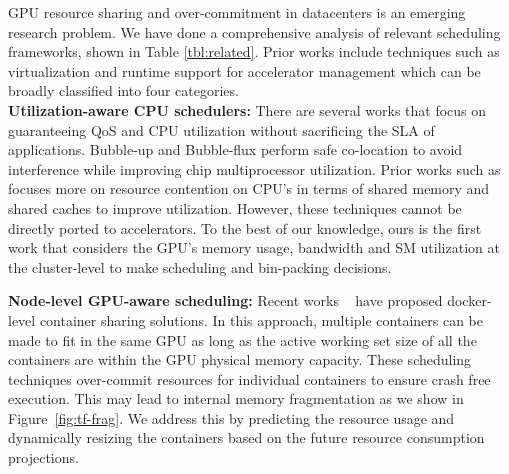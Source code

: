 

GPU resource sharing and over-commitment in datacenters is an emerging research problem. We have done a comprehensive analysis of relevant scheduling frameworks, shown in Table \ref{tbl:related}. Prior works include techniques such as virtualization and runtime support for accelerator management which can be broadly classified into four categories.\\ 

\noindent\textbf{Utilization-aware CPU schedulers:}
There are several works that focus on guaranteeing QoS and CPU utilization without sacrificing the SLA of applications. Bubble-up \cite{Marsbubbleup} and Bubble-flux \cite{Yang:bubbleflux} perform safe co-location to avoid interference while improving chip multiprocessor utilization. Prior works such as \cite{Tang:2013:RRS:2451116.2451126} focuses more on resource contention on CPU's in terms of shared memory and shared caches to improve utilization. However, these techniques cannot be directly ported to accelerators. To the best of our knowledge, ours is the first work that considers the GPU's memory usage, bandwidth and SM utilization at the cluster-level to make scheduling and bin-packing decisions.

\noindent\textbf{Node-level GPU-aware scheduling:}
Recent works ~\cite{gleeson2017heterogeneous,kang2017convgpu} have proposed docker-level container sharing solutions. In this approach, multiple containers can be made to fit in the same GPU as long as the active working set size of all the containers are within the GPU physical memory capacity. 
These scheduling techniques over-commit resources for individual containers to ensure crash free execution. This may lead to internal memory fragmentation as we show in Figure~\ref{fig:tf-frag}. We address this by predicting the resource usage and dynamically resizing the containers based on the future resource consumption projections.

